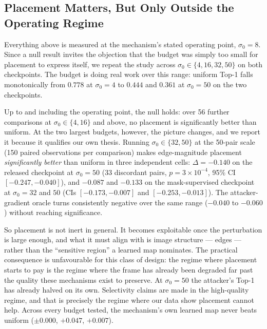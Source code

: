 \documentclass[10pt,journal]{IEEEtran}
\begin{document}
\subsection{Placement Matters, But Only Outside the Operating
Regime}
\label{sec:budget}

Everything above is measured at the mechanism's stated operating point,
$\sigma_0=8$. Since a null result invites the objection that the budget was
simply too small for placement to express itself, we repeat the study across
$\sigma_0 \in \{4, 16, 32, 50\}$ on both checkpoints. The budget is doing real
work over this range: uniform Top-1 falls monotonically from $0.778$ at
$\sigma_0=4$ to $0.444$ and $0.361$ at $\sigma_0=50$ on the two checkpoints.

Up to and including the operating point, the null holds: over 56 further
comparisons at $\sigma_0 \in \{4, 16\}$ and above, no placement is
significantly better than uniform. At the two largest budgets, however, the
picture changes, and we report it because it qualifies our own thesis. Running
$\sigma_0 \in \{32, 50\}$ at the 50-pair scale (150 paired observations per
comparison) makes edge-magnitude placement \emph{significantly better} than
uniform in three independent cells: $\Delta=-0.140$ on the released
checkpoint at $\sigma_0=50$ (33 discordant pairs, $p=3\times10^{-4}$, 95\% CI
$[-0.247,-0.040]$), and $-0.087$ and $-0.133$ on the mask-supervised
checkpoint at $\sigma_0=32$ and $50$ (CIs $[-0.173,-0.007]$ and
$[-0.253,-0.013]$). The attacker-gradient oracle turns consistently negative
over the same range ($-0.040$ to $-0.060$) without reaching significance.

So placement is not inert in general. It becomes exploitable once the
perturbation is large enough, and what it must align with is image structure
--- edges --- rather than the ``sensitive region'' a learned map nominates.
The practical consequence is unfavourable for this class of design: the regime
where placement starts to pay is the regime where the frame has already been
degraded far past the quality these mechanisms exist to preserve. At
$\sigma_0=50$ the attacker's Top-1 has already halved on its own. Selectivity
claims are made in the high-quality regime, and that is precisely the regime
where our data show placement cannot help. Across every budget tested, the
mechanism's own learned map never beats uniform ($\pm0.000$, $+0.047$,
$+0.007$).
\end{document}
